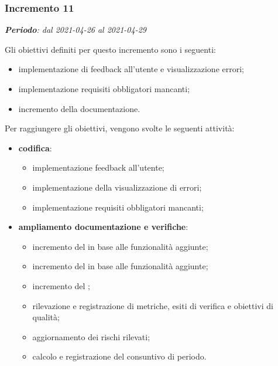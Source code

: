 \subsubsection{Incremento 11}
\textit{\textbf{Periodo}: dal 2021-04-26 al 2021-04-29}

Gli obiettivi definiti per questo incremento sono i seguenti:
\begin{itemize}
\item implementazione di feedback all'utente e visualizzazione errori;
\item implementazione requisiti obbligatori mancanti;
\item incremento della documentazione.
\end{itemize}

Per raggiungere gli obiettivi, vengono svolte le seguenti attività:
\begin{itemize}
\item \textbf{codifica}: 
\begin{itemize}
\item implementazione feedback all'utente;
\item implementazione della visualizzazione di errori;
\item implementazione requisiti obbligatori mancanti; 
\end{itemize} 

\item \textbf{ampliamento documentazione e verifiche}:
\begin{itemize}

\item incremento del  in base alle funzionalità aggiunte;
\item incremento del  in base alle funzionalità aggiunte;
\item incremento del ;
\item rilevazione e registrazione di metriche, esiti di verifica e obiettivi di qualità;
\item aggiornamento dei rischi rilevati;
\item calcolo e registrazione del consuntivo di periodo.
\end{itemize}

\end{itemize}
